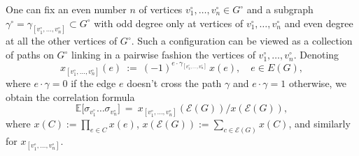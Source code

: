 \documentclass[reqno]{amsart}
\numberwithin{equation}{section}
\theoremstyle{definition}
\theoremstyle{remark}
\newcommand\cE{\mathcal{E}}
\newcommand\vcirc[1]{v^\circ_1,\ldots,v^\circ_{#1}}
\newcommand\svcirc[1]{\sigma_{v^\circ_1}\ldots \sigma_{v^\circ_{#1}}}
\begin{document}
One can fix an even number $n$ of vertices $\vcirc{n}\in G^\circ$ and a subgraph $\gamma^\circ=\gamma_{[\vcirc{n}]}\subset G^\circ$ with odd degree only at vertices of $\vcirc{n}$ and even degree at all the other vertices of $G^\circ$. Such a configuration can be viewed as a collection of paths on $G^\circ$ linking in a pairwise fashion the vertices of $\vcirc{n}$. Denoting
\[
x_{[\vcirc{n}]}(e)\ :=\ (-1)^{e\cdot\gamma_{[\vcirc{n}]}}\,x(e),\quad e\in E(G),
\]
where $e\cdot\gamma=0$ if the edge $e$ doesn't cross the path $\gamma$ and $e\cdot\gamma=1$ otherwise, we obtain the correlation formula
\begin{equation}
\label{eq:Esigma}
\textstyle \mathbb E\big[\svcirc{n}\big]\ =\ {x_{[\vcirc{n}]}(\cE(G))}\big/{x(\cE(G))},
\end{equation}
where $x(C):=\prod_{e\in C}x(e)$, $x(\cE(G)):=\sum_{c\in\cE(G)}x(C)$, and similarly for $x_{[\vcirc{n}]}$.
\end{document}

